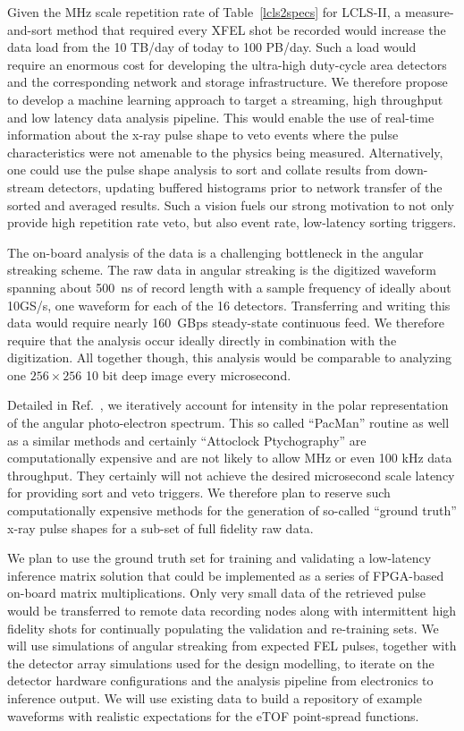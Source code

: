 Given the MHz scale repetition rate of Table~\ref{lcls2specs} for LCLS-II, a measure-and-sort method that required every XFEL shot be recorded would increase the data load from the 10 TB/day of today to 100 PB/day.
Such a load would require an enormous cost for developing the ultra-high duty-cycle area detectors and the corresponding network and storage infrastructure. 
We therefore propose to develop a machine learning approach to target a streaming, high throughput and low latency data analysis pipeline.
This would enable the use of real-time information about the x-ray pulse shape to veto events where the pulse characteristics were not amenable to the physics being measured.
Alternatively, one could use the pulse shape analysis to sort and collate results from down-stream detectors, updating buffered histograms prior to network transfer of the sorted and averaged results.
Such a vision fuels our strong motivation to not only provide high repetition rate veto, but also event rate, low-latency sorting triggers.

The on-board analysis of the data is a challenging bottleneck in the angular streaking scheme.
The raw data in angular streaking is the digitized waveform spanning about 500~ns of record length with a sample frequency of ideally about 10GS/s, one waveform for each of the 16 detectors.
Transferring and writing this data would require nearly 160~GBps steady-state continuous feed.
We therefore require that the analysis occur ideally directly in combination with the digitization.
All together though, this analysis would be comparable to analyzing one $256\times256$ 10 bit deep image every microsecond.

Detailed in Ref.~\cite{Nick2018}, we iteratively account for intensity in the polar representation of the angular photo-electron spectrum.
This so called ``PacMan'' routine as well as a similar methods \cite{Thomas2015,Siqi2018,Worner2018} and certainly ``Attoclock Ptychography'' \cite{Feurer2018} are computationally expensive and are not likely to allow MHz or even 100 kHz data throughput.
They certainly will not achieve the desired microsecond scale latency for providing sort and veto triggers.
We therefore plan to reserve such computationally expensive methods for the generation of so-called ``ground truth'' x-ray pulse shapes for a sub-set of full fidelity raw data.

We plan to use the ground truth set for training and validating a low-latency inference matrix solution that could be implemented as a series of FPGA-based on-board matrix multiplications.
Only very small data of the retrieved pulse would be transferred to remote data recording nodes along with intermittent high fidelity shots for continually populating the validation and re-training sets.
We will use simulations of angular streaking from expected FEL pulses, together with the detector array simulations used for the design modelling, to iterate on the detector hardware configurations and the analysis pipeline from electronics to inference output.
We will use existing data to build a repository of example waveforms with realistic expectations for the eTOF point-spread functions.  

